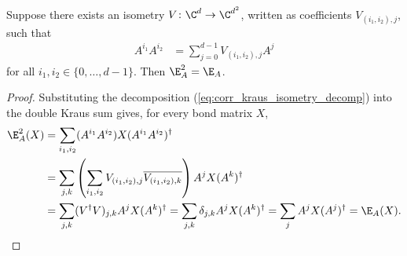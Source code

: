 \begin{lemma}
    \label{thm:physical_blocking_implies_transfer_idempotence}
    \leanok
    Suppose there exists an isometry
    $V\colon \C^d\to\C^{d^2}$, written as coefficients $V_{(i_1,i_2),j}$, such
    that
    \begin{align}
        A^{i_1}A^{i_2}
         & =\sum_{j=0}^{d-1}V_{(i_1,i_2),j}A^j
        \label{eq:corr_kraus_isometry_decomp}
    \end{align}
    for all $i_1,i_2\in\{0,\ldots,d-1\}$.
    Then $\E_A^2=\E_A$.
\end{lemma}
\begin{proof}\leanok
    Substituting the decomposition (\ref{eq:corr_kraus_isometry_decomp}) into
    the double Kraus sum gives, for every bond matrix $X$,
    \begin{align}
        \E_A^2(X)
         & =\sum_{i_1,i_2}(A^{i_1}A^{i_2})X
        (A^{i_1}A^{i_2})^\dagger
        \notag                                             \\
         & =\sum_{j,k}\left(\sum_{i_1,i_2}
        V_{(i_1,i_2),j}\overline{V_{(i_1,i_2),k}}\right)A^jX(A^k)^\dagger
        \notag                                             \\
         & =\sum_{j,k}(V^\dagger V)_{j,k}A^jX(A^k)^\dagger
        =\sum_{j,k}\delta_{j,k}A^jX(A^k)^\dagger
        =\sum_jA^jX(A^j)^\dagger
        =\E_A(X).
        \notag
    \end{align}
\end{proof}

